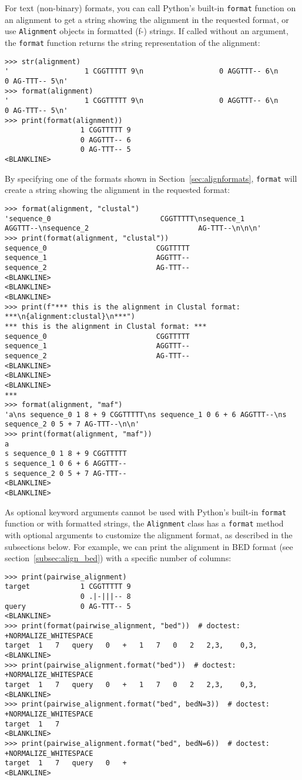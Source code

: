 For text (non-binary) formats, you can call Python's built-in \verb|format| function on an alignment to get a string showing the alignment in the requested format, or use \verb|Alignment| objects in formatted (f-) strings. If called without an argument, the \verb|format| function returns the string representation of the alignment:
\begin{verbatim}
>>> str(alignment)
'                  1 CGGTTTTT 9\n                  0 AGGTTT-- 6\n                  0 AG-TTT-- 5\n'
>>> format(alignment)
'                  1 CGGTTTTT 9\n                  0 AGGTTT-- 6\n                  0 AG-TTT-- 5\n'
>>> print(format(alignment))
                  1 CGGTTTTT 9
                  0 AGGTTT-- 6
                  0 AG-TTT-- 5
<BLANKLINE>
\end{verbatim}
By specifying one of the formats shown in Section~\ref{sec:alignformats}, \verb+format+ will create a string showing the alignment in the requested format:
\begin{verbatim}
>>> format(alignment, "clustal")
'sequence_0                          CGGTTTTT\nsequence_1                          AGGTTT--\nsequence_2                          AG-TTT--\n\n\n'
>>> print(format(alignment, "clustal"))
sequence_0                          CGGTTTTT
sequence_1                          AGGTTT--
sequence_2                          AG-TTT--
<BLANKLINE>
<BLANKLINE>
<BLANKLINE>
>>> print(f"*** this is the alignment in Clustal format: ***\n{alignment:clustal}\n***")
*** this is the alignment in Clustal format: ***
sequence_0                          CGGTTTTT
sequence_1                          AGGTTT--
sequence_2                          AG-TTT--
<BLANKLINE>
<BLANKLINE>
<BLANKLINE>
***
>>> format(alignment, "maf")
'a\ns sequence_0 1 8 + 9 CGGTTTTT\ns sequence_1 0 6 + 6 AGGTTT--\ns sequence_2 0 5 + 7 AG-TTT--\n\n'
>>> print(format(alignment, "maf"))
a
s sequence_0 1 8 + 9 CGGTTTTT
s sequence_1 0 6 + 6 AGGTTT--
s sequence_2 0 5 + 7 AG-TTT--
<BLANKLINE>
<BLANKLINE>
\end{verbatim}

As optional keyword arguments cannot be used with Python's built-in \verb|format| function or with formatted strings, the \verb|Alignment| class has a \verb|format| method with optional arguments to customize the alignment format, as described in the subsections below. For example, we can print the alignment in BED format (see section~\ref{subsec:align_bed}) with a specific number of columns:
\begin{verbatim}
>>> print(pairwise_alignment)
target            1 CGGTTTTT 9
                  0 .|-|||-- 8
query             0 AG-TTT-- 5
<BLANKLINE>
>>> print(format(pairwise_alignment, "bed"))  # doctest: +NORMALIZE_WHITESPACE
target	1	7	query	0	+	1	7	0	2	2,3,	0,3,
<BLANKLINE>
>>> print(pairwise_alignment.format("bed"))  # doctest: +NORMALIZE_WHITESPACE
target	1	7	query	0	+	1	7	0	2	2,3,	0,3,
<BLANKLINE>
>>> print(pairwise_alignment.format("bed", bedN=3))  # doctest: +NORMALIZE_WHITESPACE
target	1	7
<BLANKLINE>
>>> print(pairwise_alignment.format("bed", bedN=6))  # doctest: +NORMALIZE_WHITESPACE
target	1	7	query	0	+
<BLANKLINE>
\end{verbatim}

